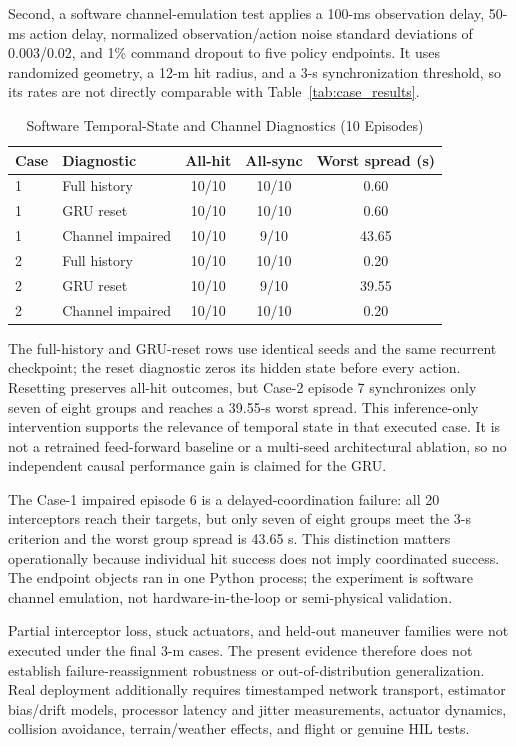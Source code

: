 \documentclass[lettersize,journal]{IEEEtran}
\begin{document}
{Second, a software channel-emulation test applies a 100-ms observation delay,
50-ms action delay, normalized observation/action noise standard deviations of
0.003/0.02, and 1\% command dropout to five policy endpoints. It uses randomized
geometry, a 12-m hit radius, and a 3-s synchronization threshold, so its rates
are not directly comparable with Table~\ref{tab:case_results}.

\begin{table}[!t]
\centering
\caption{Software Temporal-State and Channel Diagnostics (10 Episodes)}
\label{tab:channel_results}
\footnotesize
\begin{tabular}{llccc}
\toprule
Case & Diagnostic & All-hit & All-sync & Worst spread (s) \\
\midrule
1 & Full history & 10/10 & 10/10 & 0.60 \\
1 & GRU reset & 10/10 & 10/10 & 0.60 \\
1 & Channel impaired & 10/10 & 9/10 & 43.65 \\
2 & Full history & 10/10 & 10/10 & 0.20 \\
2 & GRU reset & 10/10 & 9/10 & 39.55 \\
2 & Channel impaired & 10/10 & 10/10 & 0.20 \\
\bottomrule
\end{tabular}
\end{table}

The full-history and GRU-reset rows use identical seeds and the same recurrent
checkpoint; the reset diagnostic zeros its hidden state before every action. Resetting
preserves all-hit outcomes, but Case-2 episode 7 synchronizes only seven of eight
groups and reaches a 39.55-s worst spread. This inference-only intervention supports
the relevance of temporal state in that executed case. It is not a retrained
feed-forward baseline or a multi-seed architectural ablation, so no independent
causal performance gain is claimed for the GRU.

The Case-1 impaired episode 6 is a delayed-coordination failure: all 20
interceptors reach their targets, but only seven of eight groups meet the 3-s
criterion and the worst group spread is 43.65 s. This distinction matters
operationally because individual hit success does not imply coordinated success.
The endpoint objects ran in one Python process; the experiment is software
channel emulation, not hardware-in-the-loop or semi-physical validation.

Partial interceptor loss, stuck actuators, and held-out maneuver families were
not executed under the final 3-m cases. The present evidence therefore does not
establish failure-reassignment robustness or out-of-distribution generalization.
Real deployment additionally requires timestamped network transport, estimator
bias/drift models, processor latency and jitter measurements, actuator dynamics,
collision avoidance, terrain/weather effects, and flight or genuine HIL tests.


}
\end{document}
